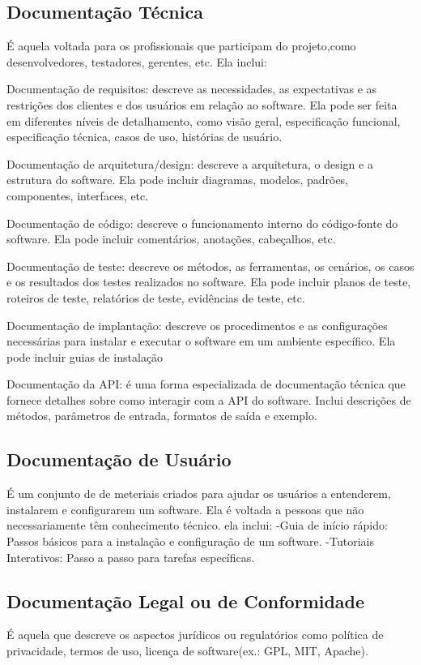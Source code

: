 \documentclass[12pt,oneside,a4paper,article]{abntex2}
\begin{document}
\subsection{Documentação Técnica}
É aquela voltada para os profissionais que participam do projeto,como desenvolvedores, testadores, gerentes, etc. Ela inclui:

Documentação de requisitos: descreve as necessidades, as expectativas e as restrições dos clientes e dos usuários em relação ao software. Ela pode ser feita em diferentes níveis de detalhamento,
como visão geral, especificação funcional, especificação técnica, casos de uso, histórias de usuário.


Documentação de arquitetura/design: descreve a arquitetura, o design e a estrutura do software. Ela pode
incluir diagramas, modelos, padrões, componentes, interfaces, etc.


Documentação de código: descreve o funcionamento interno do código-fonte do software. Ela
pode incluir comentários, anotações, cabeçalhos, etc.


Documentação de teste: descreve os métodos, as ferramentas, os cenários, os casos e os resultados
dos testes realizados no software. Ela pode incluir planos de teste, roteiros de teste, relatórios de
teste, evidências de teste, etc.


Documentação de implantação: descreve os procedimentos e as configurações necessárias para
instalar e executar o software em um ambiente específico. Ela pode incluir guias de instalação

Documentação da API: é uma forma especializada de documentação
técnica que fornece detalhes sobre como interagir com a API do software. Inclui descrições de
métodos, parâmetros de entrada, formatos de saída e exemplo.

\subsection{Documentação de Usuário}
É um conjunto de de meteriais criados para ajudar os
usuários a entenderem, instalarem e configurarem um software. Ela é voltada a pessoas
que não necessariamente têm conhecimento técnico. ela inclui:
-Guia de início rápido: Passos básicos para a instalação e configuração de um software.
-Tutoriais Interativos: Passo a passo para tarefas específicas.

\subsection{Documentação Legal ou de Conformidade}
É aquela que descreve os aspectos jurídicos ou regulatórios como política de privacidade, termos de uso, licença de software(ex.: GPL, MIT, Apache).
\end{document}
